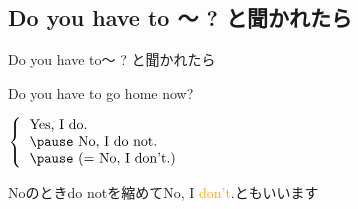\documentclass[aspectratio=169,xcolor={dvipsnames,table}]{beamer}
\newcommand{\myaudio}[1]{\href{#1}{\faVolumeUp}}
\begin{document}
\subsection{Do you have to 〜 ? と聞かれたら}
 \begin{frame}[plain]{Do you have to〜 ? と聞かれたら}
 \Large
\pause

Do you have to go home now?

\vspace{20pt}
\pause

\mbox{}\hspace{100pt}$\left\{\begin{tabular}{l}
         \text{Yes, I do.}\\\pause
         \text{No, I do not.}\\\pause
         \text{(}= \text{No, I don't.)}
        \end{tabular}\right.$

\pause

\mbox{}\hfill{}{\small Noのときdo notを縮めてNo, I \textcolor{orange}{don't}.ともいいます}%
\hfill{\scriptsize \myaudio{./audio/014_have_to_09.mp3}}

\end{frame}
\end{document}
